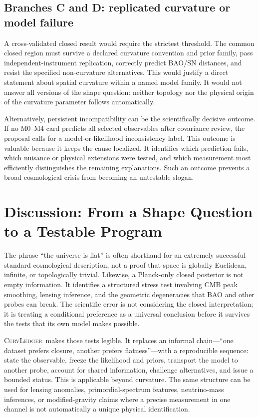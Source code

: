 \documentclass[conference]{IEEEtran}
\newcommand{\curvledger}{\textsc{CurvLedger}}
\begin{document}
\subsection{Branches C and D: replicated curvature or model failure}

A cross-validated closed result would require the strictest threshold. The common closed region must survive a declared curvature convention and prior family, pass independent-instrument replication, correctly predict BAO/SN distances, and resist the specified non-curvature alternatives. This would justify a direct statement about spatial curvature within a named model family. It would not answer all versions of the shape question: neither topology nor the physical origin of the curvature parameter follows automatically.

Alternatively, persistent incompatibility can be the scientifically decisive outcome. If no M0--M4 card predicts all selected observables after covariance review, the proposal calls for a model-or-likelihood inconsistency label. This outcome is valuable because it keeps the cause localized. It identifies which prediction fails, which nuisance or physical extensions were tested, and which measurement most efficiently distinguishes the remaining explanations. Such an outcome prevents a broad cosmological crisis from becoming an untestable slogan.
\section{Discussion: From a Shape Question to a Testable Program}

The phrase ``the universe is flat'' is often shorthand for an extremely successful standard cosmological description, not a proof that space is globally Euclidean, infinite, or topologically trivial. Likewise, a Planck-only closed posterior is not empty information. It identifies a structured stress test involving CMB peak smoothing, lensing inference, and the geometric degeneracies that BAO and other probes can break. The scientific error is not considering the closed interpretation; it is treating a conditional preference as a universal conclusion before it survives the tests that its own model makes possible.

\curvledger\ makes those tests legible. It replaces an informal chain---``one dataset prefers closure, another prefers flatness''---with a reproducible sequence: state the observable, freeze the likelihood and priors, transport the model to another probe, account for shared information, challenge alternatives, and issue a bounded status. This is applicable beyond curvature. The same structure can be used for lensing anomalies, primordial-spectrum features, neutrino-mass inferences, or modified-gravity claims where a precise measurement in one channel is not automatically a unique physical identification.
\end{document}
